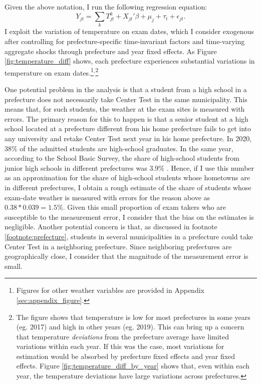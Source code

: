 \documentclass[12pt,letterpaper]{article}
\begin{document}
Given the above notation, I run the following regression equation:
\begin{equation*}
  Y_{jt} = \sum_k T_{jt}^k + X_{jt}' \beta + \mu_j + \tau_t + \epsilon_{jt}.
\end{equation*}
I exploit the variation of temperature on exam dates, which I consider exogenous after controlling for prefecture-specific time-invariant factors and time-varying aggregate shocks through prefecture and year fixed effects.
As Figure \ref{fig:temperature_diff} shows, each prefecture experiences substantial variations in temperature on exam dates.\footnote{
  Figures for other weather variables are provided in Appendix \ref{sec:appendix_figure}.
}$^,$\footnote{
  The figure shows that temperature is low for most prefectures in some years (eg. 2017) and high in other years (eg. 2019).
  This can bring up a concern that temperature \textit{deviations} from the prefecture average have limited variations within each year.
  If this was the case, most variations for estimation would be absorbed by prefecture fixed effects and year fixed effects.
  Figure \ref{fig:temperature_diff_by_year} shows that, even within each year, the temperature deviations have large variations across prefectures.
}

One potential problem in the analysis is that a student from a high school in a prefecture does not necessarily take Center Test in the same municipality.
This means that, for such students, the weather at the exam sites is measured with errors.
The primary reason for this to happen is that a senior student at a high school located at a prefecture different from his home prefecture fails to get into any university and retake Center Test next year in his home prefecture.
In 2020, 38\% of the admitted students are high-school graduates.
In the same year, according to the School Basic Survey, the share of high-school students from junior high schools in different prefectures was 3.9\% \citep{eStat}.
Hence, if I use this number as an approximation for the share of high-school students whose hometowns are in different prefectures, I obtain a rough estimate of the share of students whose exam-date weather is measured with errors for the reason above as $0.38 * 0.039 = 1.5\%$. 
Given this small proportion of exam takers who are susceptible to the measurement error, I consider that the bias on the estimates is negligible.
Another potential concern is that, as discussed in footnote \ref{footnote:prefecture}, students in several municipalities in a prefecture could take Center Test in a neighboring prefecture.
Since neighboring prefectures are geographically close, I consider that the magnitude of the measurement error is small.
\end{document}
